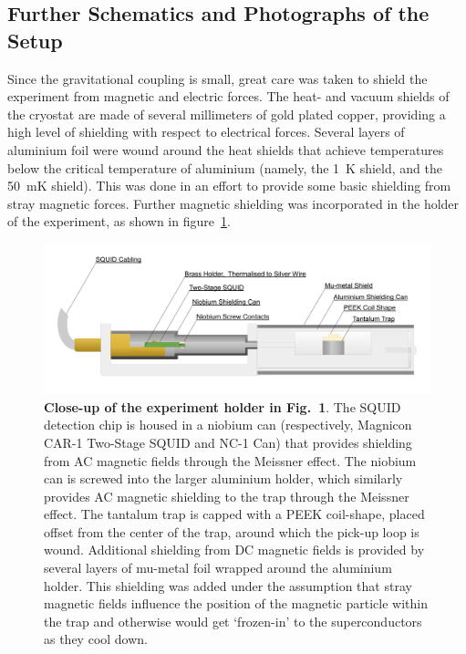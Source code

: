 \begin{appendices}

\setcounter{equation}{0}
\setcounter{figure}{0}
\renewcommand{\theequation}{S\arabic{equation}}
\renewcommand{\thefigure}{S\arabic{figure}}

\section{Further Schematics and Photographs of the Setup}

\label{app:photo}
Since the gravitational coupling is small, great care was taken to shield the experiment from magnetic and electric forces. The heat- and vacuum shields of the cryostat are made of several millimeters of gold plated copper, providing a high level of shielding with respect to electrical forces. Several layers of aluminium foil were wound around the heat shields that achieve temperatures below the critical temperature of aluminium (namely, the \SI{1}{K} shield, and the \SI{50}{mK} shield). This was done in an effort to provide some basic shielding from stray magnetic forces. Further magnetic shielding was incorporated in the holder of the experiment, as shown in figure~\ref{fig_supp:holder}.

\begin{figure}[ht]
\centering
\includegraphics[width=1\textwidth]{Appenidx/Suplement_Schematic_Holder.pdf}%
\caption{\textbf{Close-up of the experiment holder in Fig.~1}. The SQUID detection chip is housed in a niobium can (respectively, Magnicon CAR-1 Two-Stage SQUID and NC-1 Can) that provides shielding from AC magnetic fields through the Meissner effect. The niobium can is screwed into the larger aluminium holder, which similarly provides AC magnetic shielding to the trap through the Meissner effect. The tantalum trap is capped with a PEEK coil-shape, placed offset from the center of the trap, around which the pick-up loop is wound. Additional shielding from DC magnetic fields is provided by several layers of mu-metal foil wrapped around the aluminium holder. This shielding was added under the assumption that stray magnetic fields influence the position of the magnetic particle within the trap and otherwise would get `frozen-in' to the superconductors as they cool down.}\label{fig_supp:holder}
\end{figure}


\end{appendices}
